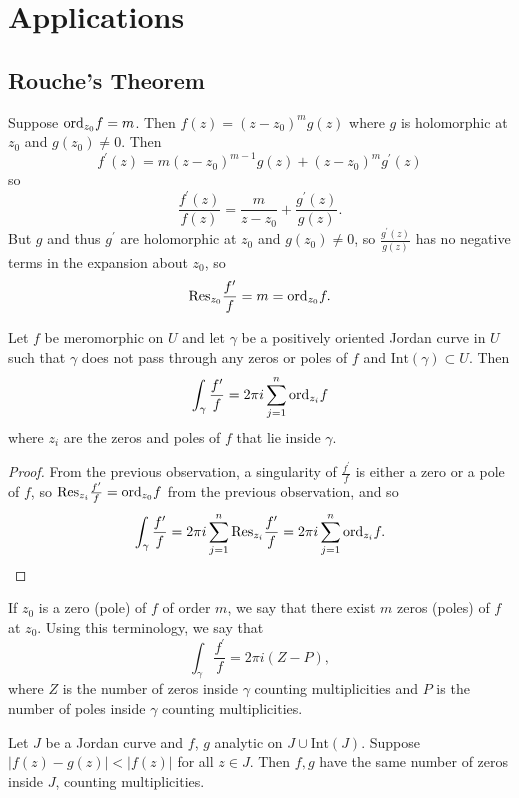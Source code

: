 \section{Applications}

\subsection{Rouche's Theorem}

Suppose $\mathrm{ord}_{z_0} f = m$. Then $f(z) = (z - z_0)^m g(z)$
where $g$ is holomorphic at $z_0$ and $g(z_0) \neq 0$. Then
$$
  f^\prime(z)
= m (z - z_0)^{m-1} g(z)
+ (z - z_0)^m g^\prime(z)
$$
so
$$
  \frac{f^\prime(z)}{f(z)}
= \frac{m}{z - z_0}
+ \frac{g^\prime(z)}{g(z)}.
$$
But $g$ and thus $g^\prime$ are holomorphic at $z_0$ and
$g(z_0) \neq 0$, so $\frac{g^\prime(z)}{g(z)}$ has no
negative terms in the expansion about $z_0$, so
$$
  \mathrm{Res}_{z_0} \frac{f^\prime}{f}
= m
= \mathrm{ord}_{z_0} f.
$$

\begin{theorem}
Let $f$ be meromorphic on $U$ and let $\gamma$ be
a positively oriented Jordan curve in $U$ such that
$\gamma$ does not pass through any zeros or poles of $f$
and $\mathrm{Int}(\gamma) \subset U$. Then
$$
  \int_\gamma
    \frac{f^\prime}{f}
= 2 \pi i
  \sum_{j=1}^n
    \mathrm{ord}_{z_i} f
$$
where $z_i$ are the zeros and poles of $f$ that lie inside $\gamma$.
\end{theorem}
\begin{proof}
From the previous observation, a singularity of
$\frac{f^\prime}{f}$ is either a zero or a pole of $f$, so
$\mathrm{Res}_{z_i} \frac{f^\prime}{f} = \mathrm{ord}_{z_0} f$ from the
previous observation, and so
$$
  \int_\gamma \frac{f^\prime}{f}
= 2 \pi i
  \sum_{j=1}^n
    \mathrm{Res}_{z_i} \frac{f^\prime}{f}
= 2 \pi i
  \sum_{j=1}^n
    \mathrm{ord}_{z_i} f.
$$
\end{proof}

If $z_0$ is a zero (pole) of $f$ of order $m$, we say that
there exist $m$ zeros (poles) of $f$ at $z_0$. Using this terminology,
we say that
$$
\int_\gamma \frac{f^\prime}{f} = 2 \pi i (Z - P),
$$
where $Z$ is the number of zeros inside $\gamma$ counting
multiplicities and $P$ is the number of poles inside $\gamma$
counting multiplicities.

\begin{theorem}
Let $J$ be a Jordan curve and $f$, $g$ analytic on $J \cup
\mathrm{Int}(J)$. Suppose $|f(z) - g(z)| < |f(z)|$ for all
$z \in J$. Then $f, g$ have the same number of zeros inside
$J$, counting multiplicities.
\end{theorem}
